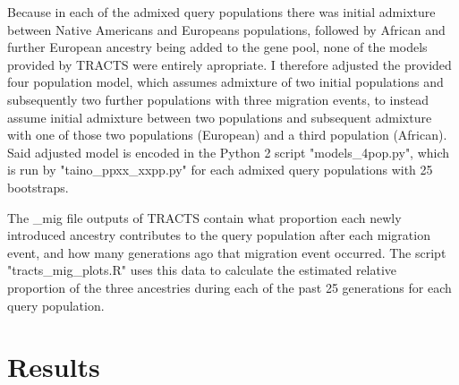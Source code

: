 \documentclass[11pt]{article}
\begin{document}
Because in each of the admixed query populations there was initial admixture between Native Americans and Europeans populations, followed by African and further European ancestry being added to the gene pool, none of the models provided by TRACTS were entirely apropriate. I therefore adjusted the provided four population model, which assumes admixture of two initial populations and subsequently two further populations with three migration events, to instead assume initial admixture between two populations and subsequent admixture with one of those two populations (European) and a third population (African). Said adjusted model is encoded in the Python 2 script "models\_4pop.py", which is run by "taino\_ppxx\_xxpp.py" for each admixed query populations with 25 bootstraps.

The \_mig file outputs of TRACTS contain what proportion each newly introduced ancestry contributes to the query population after each migration event, and how many generations ago that migration event occurred. The script "tracts\_mig\_plots.R" uses this data to calculate the estimated relative proportion of the three ancestries during each of the past 25 generations for each query population. 







\vspace{8mm}
\section{Results}


\end{document}
